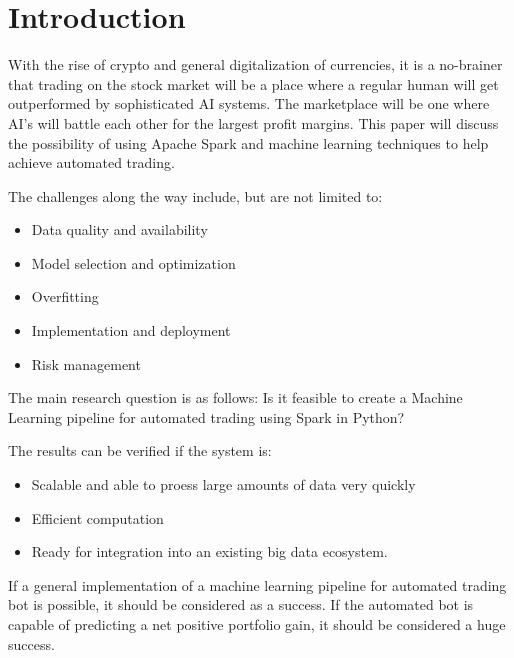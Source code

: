 
\section{Introduction}%
\label{sec:introductie}

With the rise of crypto and general digitalization of currencies, it is a no-brainer that trading on the stock market will be a place where a regular human will get outperformed by sophisticated AI systems. The marketplace will be one where AI's will battle each other for the largest profit margins. \autocite{Ianenko_2019}
This paper will discuss the possibility of using Apache Spark and machine learning techniques to help achieve automated trading. 

The challenges along the way include, but are not limited to:

\begin{itemize}
    \item Data quality and availability
    \item Model selection and optimization
    \item Overfitting
    \item Implementation and deployment
    \item Risk management
\end{itemize}


The main research question is as follows: Is it feasible to create a Machine Learning pipeline for automated trading using Spark in Python? 

The results can be verified if the system is: 

\begin{itemize}
    \item Scalable and able to proess large amounts of data very quickly
    \item Efficient computation
    \item Ready for integration into an existing big data ecosystem.
\end{itemize}

If a general implementation of a machine learning pipeline for automated trading bot is possible, it should be considered as a success.
If the automated bot is capable of predicting a net positive portfolio gain, it should be considered a huge success.



